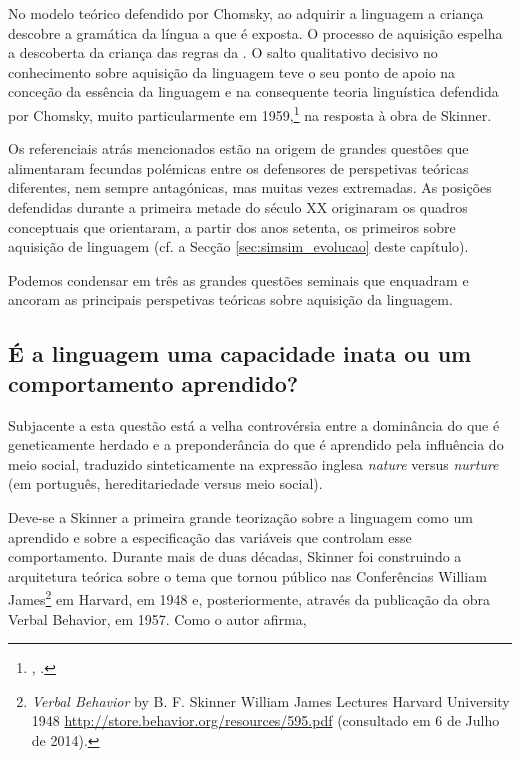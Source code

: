 \documentclass[output=paper]{LSP/langsci}
\begin{document}
No modelo teórico defendido por Chomsky, ao adquirir a linguagem a criança descobre a gramática da língua a que é exposta. O processo de aquisição espelha a descoberta da criança das regras da . O salto qualitativo decisivo no conhecimento sobre aquisição da linguagem teve o seu ponto de apoio na conceção da essência da linguagem e na consequente teoria linguística defendida por Chomsky, muito particularmente em 1959,\footnote{, \citeyear{chomsky1959}.} na resposta à obra  \citeyearpar{skinner57} de Skinner. 

Os referenciais atrás mencionados estão na origem de grandes questões que alimentaram fecundas polémicas entre os defensores de perspetivas teóricas diferentes, nem sempre antagónicas, mas muitas vezes extremadas. As posições defendidas durante a primeira metade do século XX originaram os quadros conceptuais que orientaram, a partir dos anos setenta, os primeiros  sobre aquisição de linguagem (cf. a Secção \ref{sec:simsim_evolucao} deste capítulo). 

Podemos condensar em três as grandes questões seminais que enquadram e ancoram as principais perspetivas teóricas sobre aquisição da linguagem.

\subsection{É a linguagem uma capacidade inata ou um comportamento aprendido?}
\label{subsec:simsim_inata_aprendido}
Subjacente a esta questão está a velha controvérsia entre a dominância do que é geneticamente herdado e a preponderância do que é aprendido pela influência do meio social, traduzido sinteticamente na expressão inglesa \emph{nature} versus \emph{nurture} (em português, hereditariedade versus meio social).

Deve-se a Skinner a primeira grande teorização sobre a linguagem como um  aprendido e sobre a especificação das variáveis que controlam esse comportamento. Durante mais de duas décadas, Skinner foi construindo a arquitetura teórica sobre o tema que tornou público nas Conferências William James\footnote{\textit{Verbal Behavior} by B. F. Skinner William James Lectures Harvard University 1948 \url{http://store.behavior.org/resources/595.pdf} (consultado em 6 de Julho de 2014).} em Harvard, em 1948 e, posteriormente, através da publicação da obra Verbal Behavior, em 1957. Como o autor afirma, 
\end{document}
